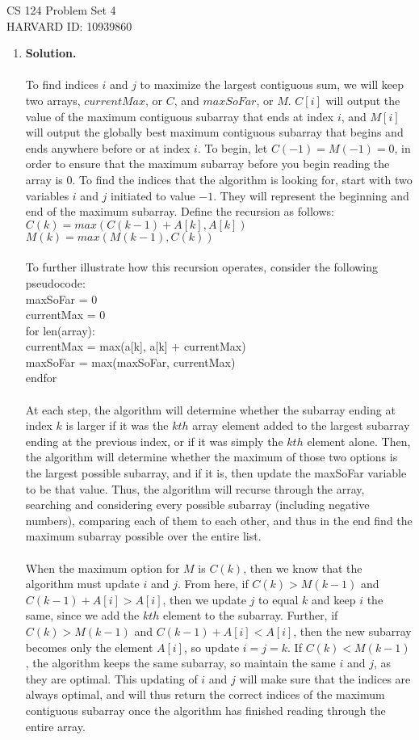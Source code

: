 \documentclass[11pt]{article}
\newcommand\solution{%
  \textbf{Solution.}\\%
}
\begin{document}
CS 124 Problem Set 4 \\
\indent HARVARD ID: 10939860

\begin{enumerate}

\item

\solution \\
To find indices $i$ and $j$ to maximize the largest contiguous sum, we will keep two arrays, $currentMax$, or $C$, and $maxSoFar$, or $M$. $C[i]$ will output the value of the maximum contiguous subarray that ends at index $i$, and $M[i]$ will output the globally best maximum contiguous subarray that begins and ends anywhere before or at index $i$. To begin, let $C(-1) = M(-1) = 0$, in order to ensure that the maximum subarray before you begin reading the array is 0. To find the indices that the algorithm is looking for, start with two variables $i$ and $j$ initiated to value $-1$. They will represent the beginning and end of the maximum subarray. Define the recursion as follows: \\
$C(k) = max(C(k-1)+A[k], A[k])$ \\
$M(k) = max(M(k-1),C(k))$ \\\\
To further illustrate how this recursion operates, consider the following pseudocode: \\
maxSoFar = 0 \\
currentMax = 0 \\
for len(array): \\
	currentMax = max(a[k], a[k] + currentMax) \\
	maxSoFar = max(maxSoFar, currentMax) \\
endfor \\
\\
At each step, the algorithm will determine whether the subarray ending at index $k$ is larger if it was the $kth$ array element added to the largest subarray ending at the previous index, or if it was simply the $kth$ element alone. Then, the algorithm will determine whether the maximum of those two options is the largest possible subarray, and if it is, then update the maxSoFar variable to be that value. Thus, the algorithm will recurse through the array, searching and considering every possible subarray (including negative numbers), comparing each of them to each other, and thus in the end find the maximum subarray possible over the entire list. \\
\\
When the maximum option for $M$ is $C(k)$, then we know that the algorithm must update $i$ and $j$. From here, if $C(k) > M(k-1)$ and $C(k-1) + A[i] > A[i]$, then we update $j$ to equal $k$ and keep $i$ the same, since we add the $kth$ element to the subarray. Further, if $C(k) > M(k-1)$ and $C(k-1) + A[i] < A[i]$, then the new subarray becomes only the element $A[i]$, so update $i = j = k$. If $C(k) < M(k-1)$, the algorithm keeps the same subarray, so maintain the same $i$ and $j$, as they are optimal. This updating of $i$ and $j$ will make sure that the indices are always optimal, and will thus return the correct indices of the maximum contiguous subarray once the algorithm has finished reading through the entire array. \\

\end{enumerate}
\end{document}
